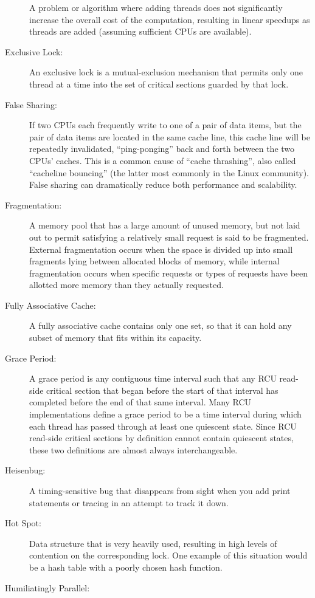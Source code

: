 \begin{description}
	A problem or algorithm where adding threads does not significantly
	increase the overall cost of the computation, resulting in
	linear speedups as threads are added (assuming sufficient
	CPUs are available).
\item[Exclusive Lock:]
	An exclusive lock is a mutual-exclusion mechanism that
	permits only one thread at a time into the
	set of critical sections guarded by that lock.
\item[False Sharing:]
	If two CPUs each frequently write to one of a pair of data items,
	but the pair of data items are located in the same cache line,
	this cache line will be repeatedly invalidated, ``ping-ponging''
	back and forth between the two CPUs' caches.
	This is a common cause of ``cache thrashing'', also called
	``cacheline bouncing'' (the latter most commonly in the Linux
	community).
	False sharing can dramatically reduce both performance and
	scalability.
\item[Fragmentation:]
	A memory pool that has a large amount of unused memory, but
	not laid out to permit satisfying a relatively small request
	is said to be fragmented.
	External fragmentation occurs when the space is divided up
	into small fragments lying between allocated blocks of memory,
	while internal fragmentation occurs when specific requests or
	types of requests have been allotted more memory than they
	actually requested.
\item[Fully Associative Cache:]
	A fully associative cache contains only
	one set, so that it can hold any subset of
	memory that fits within its capacity.
\item[Grace Period:]
	A grace period is any contiguous time interval such that
	any RCU read-side critical section that began before the
	start of that interval has
	completed before the end of that same interval.
	Many RCU implementations define a grace period to be a
	time interval during which each thread has passed through at
	least one quiescent state.
	Since RCU read-side critical sections by definition cannot
	contain quiescent states, these two definitions are almost
	always interchangeable.
\item[Heisenbug:]
	A timing-sensitive bug that disappears from sight when you
	add print statements or tracing in an attempt to track it
	down.
\item[Hot Spot:]
	Data structure that is very heavily used, resulting in high
	levels of contention on the corresponding lock.
	One example of this situation would be a hash table with
	a poorly chosen hash function.
\item[Humiliatingly Parallel:]

\end{description}
